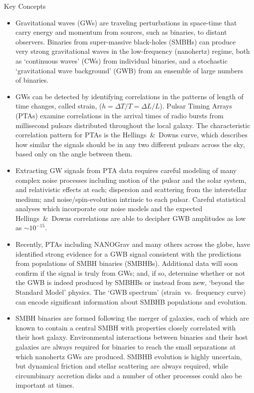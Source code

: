 \documentclass[onecolumn,authoryear]{els-mrw}
\begin{document}
\begin{BoxTypeA}{Key Concepts}
\begin{itemize}
    \item Gravitational waves (GWs) are traveling perturbations in space-time that carry energy and momentum from sources, such as binaries, to distant observers.  Binaries from super-massive black-holes (SMBHs) can produce very strong gravitational waves in the low-frequency (nanohertz) regime, both as `continuous waves' (CWs) from individual binaries, and a stochastic `gravitational wave background' (GWB) from an ensemble of large numbers of binaries.
    \item GWs can be detected by identifying correlations in the patterns of length of time changes, called strain, ($h = \Delta T / T = \Delta L / L$).  Pulsar Timing Arrays (PTAs) examine correlations in the arrival times of radio bursts from millisecond pulsars distributed throughout the local galaxy.  The characteristic correlation pattern for PTAs is the Hellings~\&~Downs curve, which describes how similar the signals should be in any two different pulsars across the sky, based only on the angle between them.
    \item Extracting GW signals from PTA data requires careful modeling of many complex noise processes including motion of the pulsar and the solar system, and relativistic effects at each; dispersion and scattering from the interstellar medium; and noise/spin-evolution intrinsic to each pulsar.  Careful statistical analyses which incorporate our noise models and the expected Hellings~\&~Downs correlations are able to decipher GWB amplitudes as low as $\sim 10^{-15}$.
    \item Recently, PTAs including NANOGrav and many others across the globe, have identified strong evidence for a GWB signal consistent with the predictions from populations of SMBH binaries (SMBHBs).  Additional data will soon confirm if the signal is truly from GWs; and, if so, determine whether or not the GWB is indeed produced by SMBHBs or instead from new, `beyond the Standard Model' physics.  The `GWB spectrum' (strain~vs.~frequency curve) can encode significant information about SMBHB populations and evolution.
    \item SMBH binaries are formed following the merger of galaxies, each of which are known to contain a central SMBH with properties closely correlated with their host galaxy.  Environmental interactions between binaries and their host galaxies are always required for binaries to reach the small separations at which nanohertz GWs are produced.  SMBHB evolution is highly uncertain, but dynamical friction and stellar scattering are always required, while circumbinary accretion disks and a number of other processes could also be important at times.

\end{itemize}
\end{BoxTypeA}
\end{document}
